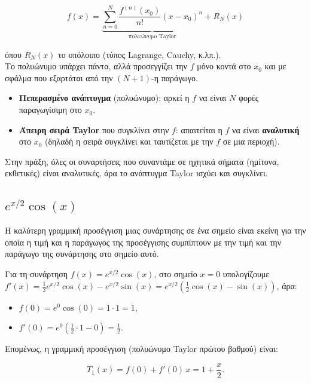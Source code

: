 \documentclass[a4paper, 11pt]{article}
\providecommand{\tightlist}{\setlength{\itemsep}{0pt}\setlength{\parskip}{0pt}}
\begin{document}
\[
f(x) = \underbrace{\sum_{n=0}^{N} \frac{f^{(n)}(x_0)}{n!} (x-x_0)^n}_{\text{πολυώνυμο Taylor}} + R_N(x)
\]

όπου \(R_N(x)\) το υπόλοιπο (τύπος Lagrange, Cauchy, κ.λπ.).\\
Το πολυώνυμο υπάρχει πάντα, αλλά προσεγγίζει την \(f\) μόνο κοντά στο
\(x_0\) και με σφάλμα που εξαρτάται από την \((N+1)\)-η παράγωγο.

\begin{itemize}
\tightlist
\item
  \textbf{Πεπερασμένο ανάπτυγμα} (πολυώνυμο): αρκεί η \(f\) να είναι
  \(N\) φορές παραγωγίσιμη στο \(x_0\).
\item
  \textbf{Άπειρη σειρά Taylor} που συγκλίνει στην \(f\): απαιτείται η
  \(f\) να είναι \textbf{αναλυτική} στο \(x_0\) (δηλαδή η σειρά
  συγκλίνει και ταυτίζεται με την \(f\) σε μια περιοχή).
\end{itemize}

Στην πράξη, όλες οι συναρτήσεις που συναντάμε σε ηχητικά σήματα
(ημίτονα, εκθετικές) είναι αναλυτικές, άρα το ανάπτυγμα Taylor ισχύει
και συγκλίνει.

\subsection{\texorpdfstring{\(e^{x/2}\cos(x)\)}{e\^{}\{x/2\}\textbackslash cos(x)}}\label{ex2cosx}

Η καλύτερη γραμμική προσέγγιση μιας συνάρτησης σε ένα σημείο είναι
εκείνη για την οποία η τιμή και η παράγωγος της προσέγγισης συμπίπτουν
με την τιμή και την παράγωγο της συνάρτησης στο σημείο αυτό.

Για τη συνάρτηση \(f(x) = e^{x/2} \cos(x)\), στο σημείο \(x = 0\)
υπολογίζουμε
\(f'(x) = \frac{1}{2} e^{x/2} \cos(x) - e^{x/2} \sin(x) = e^{x/2} \left( \frac{1}{2} \cos(x) - \sin(x) \right)\),
άρα:

\begin{itemize}
\item
  \(f(0) = e^{0} \cos(0) = 1 \cdot 1 = 1\),
\item
  \(f'(0) = e^{0} \left( \frac{1}{2} \cdot 1 - 0 \right) = \frac{1}{2}\).
\end{itemize}

Επομένως, η γραμμική προσέγγιση (πολυώνυμο Taylor πρώτου βαθμού) είναι:

\[
\boxed{T_1(x) = f(0) + f'(0) \, x = 1 + \frac{x}{2}}.
\]
\end{document}
